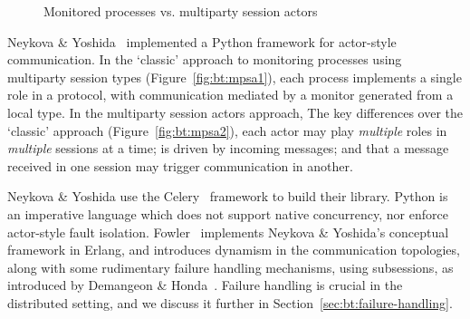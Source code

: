 \documentclass[
graybox,
envcountchap
]{svmult}
\begin{document}
\begin{bibunit}
  \begin{figure}[t]

    \hfill
    \caption{Monitored processes vs. multiparty session actors}
    \label{fig:bt:mpst-actor}
  \end{figure}


  Neykova \& Yoshida~\cite{NeykovaY16:sactor} implemented a Python framework for
  actor-style communication.
  In the `classic' approach to monitoring processes using multiparty session
  types (Figure~\ref{fig:bt:mpsa1}), each process implements a single role in a
  protocol, with communication mediated by a monitor generated from a local
  type.
  In the multiparty session actors approach,
  The key differences over the `classic' approach (Figure~\ref{fig:bt:mpsa2}),
  each actor may play \emph{multiple} roles in \emph{multiple} sessions at a
  time; is driven by incoming messages; and that a message received in one
  session may trigger communication in another.

  Neykova \& Yoshida use the Celery~\cite{celery} framework to build their
  library. Python is an imperative language which does not support native
  concurrency, nor enforce actor-style fault isolation.
  Fowler~\cite{Fowler16:actors} implements Neykova \& Yoshida's conceptual
  framework in Erlang, and introduces dynamism in the communication topologies,
  along with some rudimentary failure handling
  mechanisms, using subsessions, as introduced by Demangeon \&
  Honda~\cite{DemangeonH12:subsessions}. Failure handling is crucial in the
  distributed setting, and we discuss it further in
  Section~\ref{sec:bt:failure-handling}.


\end{bibunit}
\end{document}
